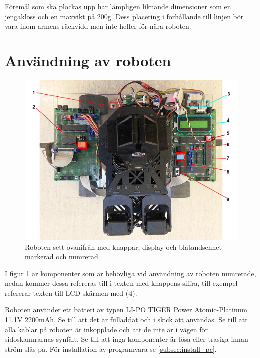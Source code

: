 \documentclass[a4paper,12pt]{article}
\begin{document}
Föremål som ska plockas upp har lämpligen liknande dimensioner som en jengakloss och en maxvikt på 200g. Dess placering i förhållande till linjen bör vara inom armens räckvidd men inte heller för nära roboten. 

%
%

\section{Användning av roboten}
\begin{figure}[H]
	\centering
	\includegraphics[width=1.0\textwidth]{oversikt_handledning.pdf}
	\caption{Roboten sett ovanifrån med knappar, display och blåtandsenhet markerad och numrerad}
	\label{fig:robot_oversikt}
\end{figure}

I figur \ref{fig:robot_oversikt} är komponenter som är behövliga vid användning av roboten numrerade, nedan kommer dessa refereras till i texten med knappens siffra, till exempel refererar texten till LCD-skärmen med (4).

Roboten använder ett batteri av typen LI-PO TIGER Power Atomic-Platinum 11.1V 2200mAh. Se till att det är fulladdat och i skick att användas. Se till att alla kablar på roboten är inkopplade och att de inte är i vägen för sidoskannrarnas synfält. Se till att inga komponenter är lösa eller trasiga innan ström slås på. För installation av programvara se \ref{subsec:install_pc}.
\end{document}
